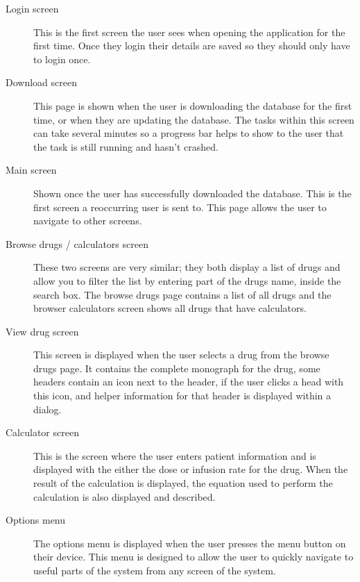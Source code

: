 \begin{description}
	\item[Login screen]
	This is the first screen the user sees when opening the application for the first time. Once they login their details are saved so they should only have to login once.
	\item[Download screen]
	This page is shown when the user is downloading the database for the first time, or when they are updating the database. The tasks within this screen can take several minutes so a progress bar helps to show to the user that the task is still running and hasn't crashed.
	\item[Main screen]
	Shown once the user has successfully downloaded the database. This is the first screen a reoccurring user is sent to. This page allows the user to navigate to other screens.
	\item[Browse drugs / calculators screen]
	These two screens are very similar; they both display a list of drugs and allow you to filter the list by entering part of the drugs name, inside the search box. The browse drugs page contains a list of all drugs and the browser calculators screen shows all drugs that have calculators.
	\item[View drug screen]
	This screen is displayed when the user selects a drug from the browse drugs page. It contains the complete monograph for the drug, some headers contain an icon next to the header, if the user clicks a head with this icon, and helper information for that header is displayed within a dialog.
	\item[Calculator screen]
	This is the screen where the user enters patient information and is displayed with the either the dose or infusion rate for the drug. When the result of the calculation is displayed, the equation used to perform the calculation is also displayed and described.
	\item[Options menu]
	The options menu is displayed when the user presses the menu button on their device. This menu is designed to allow the user to quickly navigate to useful parts of the system from any screen of the system.
\end{description}


